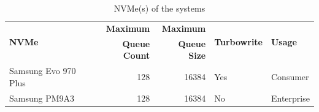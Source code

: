 \begin{table}
  \centering
  \begin{tabular}{lrrll}
    \multirow{2}{*}{\textbf{NVMe}} & \textbf{Maximum}     & \textbf{Maximum}    & \multirow{2}{*}{\textbf{Turbowrite}} & \multirow{2}{*}{\textbf{Usage}} \\
                                   & \textbf{Queue Count} & \textbf{Queue Size} &                                      &                                 \\
    \toprule

    Samsung Evo 970 Plus           & 128                  & 16384               & Yes                                  & Consumer                        \\
    Samsung PM9A3                  & 128                  & 16384               & No                                   & Enterprise                      \\

    \bottomrule
  \end{tabular}

  \caption{NVMe(s) of the systems}
  \label{tab:nvmes}
\end{table}







